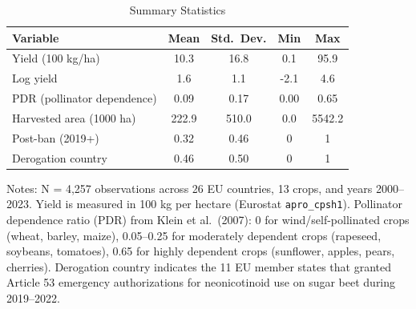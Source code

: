 \begin{table}[H]
\centering
\caption{Summary Statistics}
\label{tab:summary}
\begin{threeparttable}
\begin{tabular}{l S[table-format=4.1] S[table-format=4.1] S[table-format=4.1] S[table-format=5.1]}
\toprule
Variable & {Mean} & {Std.\ Dev.} & {Min} & {Max} \\
\midrule
Yield (100 kg/ha) & 10.3 & 16.8 & 0.1 & 95.9 \\
Log yield & 1.6 & 1.1 & -2.1 & 4.6 \\
PDR (pollinator dependence) & 0.09 & 0.17 & 0.00 & 0.65 \\
Harvested area (1000 ha) & 222.9 & 510.0 & 0.0 & 5542.2 \\
Post-ban (2019+) & 0.32 & 0.46 & 0 & 1 \\
Derogation country & 0.46 & 0.50 & 0 & 1 \\
\bottomrule
\end{tabular}
\begin{tablenotes}[flushleft]
\small
\item Notes: N = 4,257 observations across 26 EU countries, 13 crops, and years 2000--2023. Yield is measured in 100 kg per hectare (Eurostat \texttt{apro\_cpsh1}). Pollinator dependence ratio (PDR) from Klein et al.\ (2007): 0 for wind/self-pollinated crops (wheat, barley, maize), 0.05--0.25 for moderately dependent crops (rapeseed, soybeans, tomatoes), 0.65 for highly dependent crops (sunflower, apples, pears, cherries). Derogation country indicates the 11 EU member states that granted Article 53 emergency authorizations for neonicotinoid use on sugar beet during 2019--2022.
\end{tablenotes}
\end{threeparttable}
\end{table}
